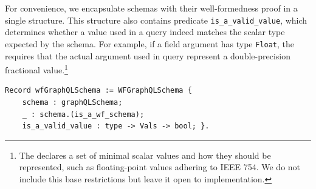 


For convenience, we encapsulate schemas with their well-formedness proof in a single structure. This structure also contains predicate \texttt{is_a_valid_value}, which determines whether a value used in a query indeed matches the scalar type expected by the schema. For example, if a field argument has type \texttt{Float}, the \spec requires that the actual argument used in query represent a double-precision fractional value.\footnote{The \spec declares a set of minimal scalar values and how they should be represented, such as floating-point values adhering to IEEE 754. We do not include this base restrictions but leave it open to implementation.}
%
\begin{verbatim}
Record wfGraphQLSchema := WFGraphQLSchema {
    schema : graphQLSchema;
    _ : schema.(is_a_wf_schema);
    is_a_valid_value : type -> Vals -> bool; }.
\end{verbatim}


